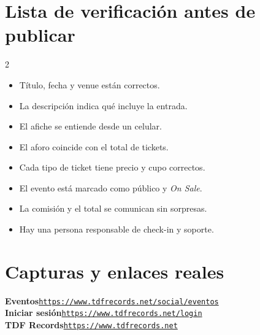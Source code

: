 \documentclass[10.5pt,letterpaper]{article}
\begin{document}
\section*{Lista de verificación antes de publicar}
\begin{tcolorbox}[enhanced,colback=TDFMist,colframe=TDFLine,boxrule=.8pt,arc=10pt,left=14pt,right=14pt,top=10pt,bottom=10pt]
\begin{multicols}{2}
\begin{itemize}[leftmargin=15pt,itemsep=4pt]
\item[$\square$] Título, fecha y venue están correctos.
\item[$\square$] La descripción indica qué incluye la entrada.
\item[$\square$] El afiche se entiende desde un celular.
\item[$\square$] El aforo coincide con el total de tickets.
\end{itemize}
\columnbreak
\begin{itemize}[leftmargin=15pt,itemsep=4pt]
\item[$\square$] Cada tipo de ticket tiene precio y cupo correctos.
\item[$\square$] El evento está marcado como público y \emph{On Sale}.
\item[$\square$] La comisión y el total se comunican sin sorpresas.
\item[$\square$] Hay una persona responsable de check-in y soporte.
\end{itemize}
\end{multicols}
\end{tcolorbox}

\clearpage
\section*{Capturas y enlaces reales}
\begin{tcolorbox}[enhanced,colback=TDFMist,colframe=TDFLine,boxrule=.8pt,arc=10pt,left=14pt,right=14pt,top=10pt,bottom=10pt]
\textbf{Eventos}\quad \href{https://www.tdfrecords.net/social/eventos}{\texttt{https://www.tdfrecords.net/social/eventos}}\\
\textbf{Iniciar sesión}\quad \href{https://www.tdfrecords.net/login}{\texttt{https://www.tdfrecords.net/login}}\\
\textbf{TDF Records}\quad \href{https://www.tdfrecords.net}{\texttt{https://www.tdfrecords.net}}
\end{tcolorbox}
\end{document}
